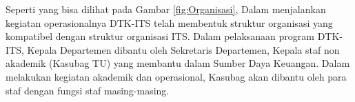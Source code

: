 Seperti yang bisa dilihat pada Gambar \ref{fig:Organisasi}, Dalam menjalankan kegiatan operasionalnya DTK-ITS telah membentuk struktur organisasi yang kompatibel dengan struktur organisasi ITS. Dalam pelaksanaan program DTK-ITS, Kepala Departemen dibantu oleh Sekretaris Departemen, Kepala staf non akademik (Kasubag TU) yang membantu dalam Sumber Daya Keuangan. Dalam melakukan kegiatan akademik dan operasional, Kasubag akan dibantu oleh para staf dengan fungsi staf masing-masing.
